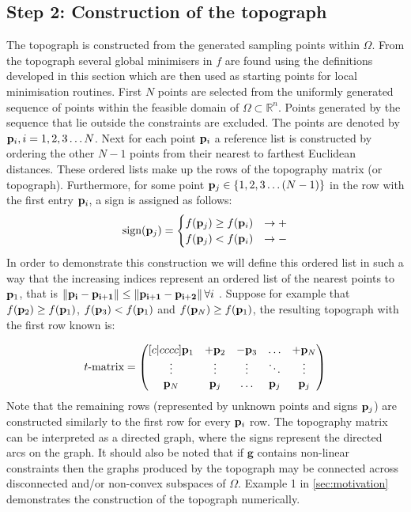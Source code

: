 \subsection{Step 2:  Construction of the topograph} \label{sec:tgo2}
The topograph is constructed from the generated sampling points within $\Omega$. From the topograph several global minimisers in $f$ are found using the definitions developed in this section which are then used as starting points for local minimisation routines. First $N$ points are selected from the uniformly generated sequence of points within the feasible domain of $\Omega \subset \mathbb{R}^n$. Points generated by the sequence that lie outside the constraints are excluded. The points are denoted by $\bold{p}_i, i = 1, 2, 3 \dots N$. Next for each point $\bold{p}_i $ a reference list is constructed by ordering the other $N -1$ points from their nearest to farthest Euclidean distances. These ordered lists make up the rows of the topography matrix (or topograph). Furthermore, for some point $\bold{p}_j \in \left\{1, 2, 3 \dots (N - 1)\right\}$ in the row with the first entry $\bold{p}_i $, a sign is assigned as follows:
\[ \textrm{sign} (\bold{p}_j) = \begin{cases} 
       f(\bold{p}_j)  \geq f(\bold{p}_i) & \rightarrow +\\
       f(\bold{p}_j) <  f(\bold{p}_i)  & \rightarrow  -
   \end{cases}
\]
In order to demonstrate this construction we will define this ordered list in such a way that the increasing indices represent an ordered list of the nearest points to $\bold{p}_1$, that is $\left\| \mathbf{\bold{p}_{i }} - \mathbf{\bold{p}_{i + 1}} \right\|  \leq \left\| \mathbf{\bold{p}_{i+1 }} - \mathbf{\bold{p}_{i + 2}} \right\|   \forall i$ .  Suppose for example that $f(\bold{p}_2)  \geq f(\bold{p}_1) $,  $f(\bold{p}_3 )< f(\bold{p}_1)$ and $f(\bold{p}_N ) \geq f(\bold{p}_1)$, the resulting topograph with the first row known is:

\begin{equation} \label{eq:tmatrix}
t \textrm{-} \textrm{matrix} =
    \begin{pmatrix} [c|cccc]
  \bold{p}_1 & +\bold{p}_2 		& -\bold{p}_3				& \dots 		&  +\bold{p}_N\\
   \vdots &    \vdots 	&     \vdots 	& \ddots 	&  \vdots\\
   \bold{p}_N & \bold{p}_j 			&  \dots			&  \bold{p}_j 		&  \bold{p}_j \\ 
    \end{pmatrix}
\end{equation}
Note that the remaining rows (represented by unknown points and signs $\bold{p}_j$) are constructed similarly to the first row for every $\bold{p}_i$ row. The topography matrix can be interpreted as a directed graph, where the signs represent the directed arcs on the graph. It should also be noted that if $\mathbf{g}$ contains non-linear constraints then the graphs produced by the topograph may be connected across disconnected and/or non-convex subspaces of $\Omega$.  Example 1 in \autoref{sec:motivation} demonstrates the construction of the topograph numerically.

